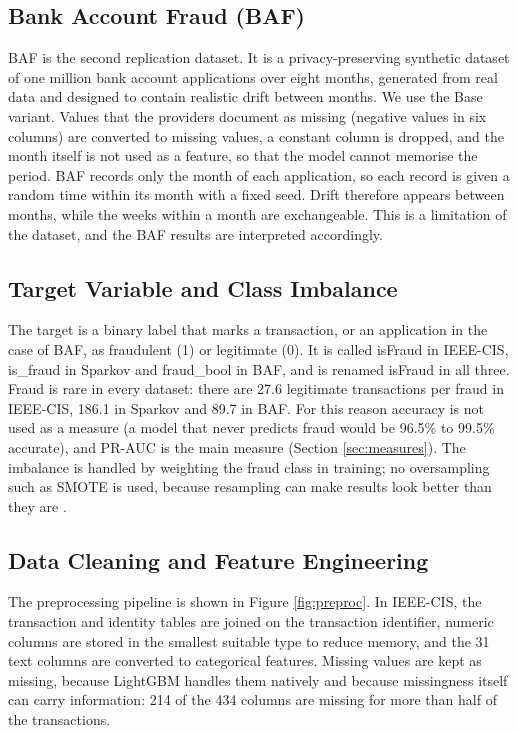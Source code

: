 \subsection{Bank Account Fraud (BAF)}\label{sec:bafds}

BAF is the second replication dataset. It is a privacy-preserving synthetic dataset of one million bank account applications over eight months, generated from real data and designed to contain realistic drift between months. We use the Base variant. Values that the providers document as missing (negative values in six columns) are converted to missing values, a constant column is dropped, and the month itself is not used as a feature, so that the model cannot memorise the period. BAF records only the month of each application, so each record is given a random time within its month with a fixed seed. Drift therefore appears between months, while the weeks within a month are exchangeable. This is a limitation of the dataset, and the BAF results are interpreted accordingly.

\subsection{Target Variable and Class Imbalance}\label{sec:target}

The target is a binary label that marks a transaction, or an application in the case of BAF, as fraudulent (1) or legitimate (0). It is called isFraud in IEEE-CIS, is\_fraud in Sparkov and fraud\_bool in BAF, and is renamed isFraud in all three. Fraud is rare in every dataset: there are 27.6 legitimate transactions per fraud in IEEE-CIS, 186.1 in Sparkov and 89.7 in BAF. For this reason accuracy is not used as a measure (a model that never predicts fraud would be 96.5\% to 99.5\% accurate), and PR-AUC is the main measure (Section \ref{sec:measures}). The imbalance is handled by weighting the fraud class in training; no oversampling such as SMOTE is used, because resampling can make results look better than they are \cite{dang2021}.

\subsection{Data Cleaning and Feature Engineering}\label{sec:cleaning}

The preprocessing pipeline is shown in Figure \ref{fig:preproc}. In IEEE-CIS, the transaction and identity tables are joined on the transaction identifier, numeric columns are stored in the smallest suitable type to reduce memory, and the 31 text columns are converted to categorical features. Missing values are kept as missing, because LightGBM handles them natively and because missingness itself can carry information: 214 of the 434 columns are missing for more than half of the transactions.


